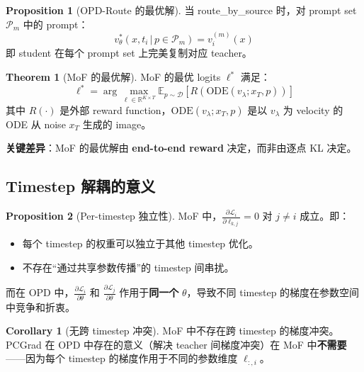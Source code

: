 \documentclass[11pt,a4paper]{article}
\newcommand{\loss}{\mathcal{L}}
\newcommand{\E}{\mathbb{E}}
\newcommand{\R}{\mathbb{R}}
\newcommand{\vtheta}{v_\theta}
\theoremstyle{definition}
\newtheorem{proposition}{Proposition}
\newtheorem{corollary}{Corollary}
\newtheorem{theorem}{Theorem}
\begin{document}
\begin{proposition}[OPD-Route 的最优解]
\label{prop:opd_route_opt}
当 route\_by\_source 时，对 prompt set $\mathcal{P}_m$ 中的 prompt：
\begin{equation}
\vtheta^*(x, t_i \,|\, p \in \mathcal{P}_m) = v^{(m)}_i(x)
\end{equation}
即 student 在每个 prompt set 上完美复制对应 teacher。
\end{proposition}

\begin{theorem}[MoF 的最优解]
\label{thm:mof_opt}
MoF 的最优 logits $\ell^*$ 满足：
\begin{equation}
\ell^* = \arg\max_{\ell \in \R^{K \times T}} \E_{p \sim \mathcal{D}}\left[R\!\left(\mathrm{ODE}(v_\lambda; x_T, p)\right)\right]
\label{eq:mof_optimal}
\end{equation}
其中 $R(\cdot)$ 是外部 reward function，$\mathrm{ODE}(v_\lambda; x_T, p)$ 是以 $v_\lambda$ 为 velocity 的 ODE 从 noise $x_T$ 生成的 image。

\textbf{关键差异}：MoF 的最优解由 \textbf{end-to-end reward} 决定，而非由逐点 KL 决定。
\end{theorem}

\subsection{Timestep 解耦的意义}

\begin{proposition}[Per-timestep 独立性]
\label{prop:timestep_decouple}
MoF 中，$\frac{\partial \loss_i}{\partial \ell_{k,j}} = 0$ 对 $j \neq i$ 成立。即：
\begin{itemize}
\item 每个 timestep 的权重可以独立于其他 timestep 优化。
\item 不存在``通过共享参数传播''的 timestep 间串扰。
\end{itemize}

而在 OPD 中，$\frac{\partial \loss_i}{\partial \theta}$ 和 $\frac{\partial \loss_j}{\partial \theta}$ 作用于\textbf{同一个} $\theta$，导致不同 timestep 的梯度在参数空间中竞争和折衷。
\end{proposition}

\begin{corollary}[无跨 timestep 冲突]
MoF 中不存在跨 timestep 的梯度冲突。PCGrad 在 OPD 中存在的意义（解决 teacher 间梯度冲突）在 MoF 中\textbf{不需要}——因为每个 timestep 的梯度作用于不同的参数维度 $\ell_{:,i}$。
\end{corollary}
\end{document}
